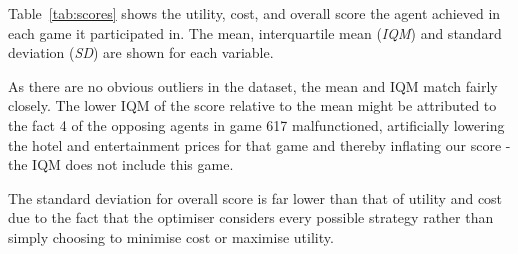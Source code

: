 \documentclass[a4paper]{proc}
\begin{document}
Table~\ref{tab:scores} shows the utility, cost, and overall score the agent achieved in each game it participated in. The mean, interquartile mean (\emph{IQM}) and standard deviation (\emph{SD}) are shown for each variable.

As there are no obvious outliers in the dataset, the mean and IQM match fairly closely. The lower IQM of the score relative to the mean might be attributed to the fact 4 of the opposing agents in game 617 malfunctioned, artificially lowering the hotel and entertainment prices for that game and thereby inflating our score - the IQM does not include this game.

The standard deviation for overall score is far lower than that of utility and cost due to the fact that the optimiser considers every possible strategy rather than simply choosing to minimise cost or maximise utility.
\end{document}
